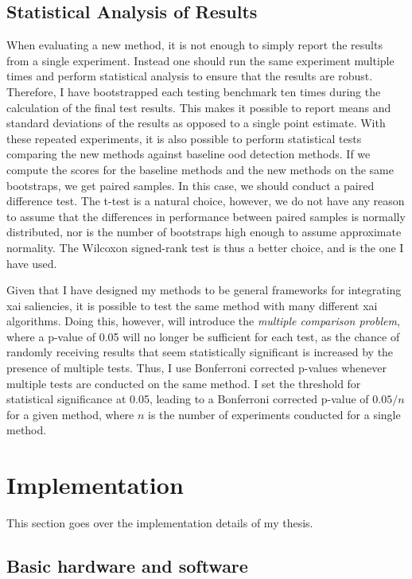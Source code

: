 \documentclass[UKenglish]{uiomasterthesis} %
\theoremstyle{definition}
\begin{document}
\subsection{Statistical Analysis of Results} \label{section:ttest_methodology}

When evaluating a new method, it is not enough to simply report the results from a single experiment. Instead one should run the same experiment multiple times and perform statistical analysis to ensure that the results are robust. Therefore, I have bootstrapped each testing benchmark ten times during the calculation of the final test results. This makes it possible to report means and standard deviations of the results as opposed to a single point estimate. With these repeated experiments, it is also possible to perform statistical tests comparing the new methods against baseline \ac{ood} detection methods. If we compute the scores for the baseline methods and the new methods on the same bootstraps, we get paired samples. In this case, we should conduct a paired difference test. The t-test is a natural choice, however, we do not have any reason to assume that the differences in performance between paired samples is normally distributed, nor is the number of bootstraps high enough to assume approximate normality. The Wilcoxon signed-rank test is thus a better choice, and is the one I have used.

Given that I have designed my methods to be general frameworks for integrating \ac{xai} saliencies, it is possible to test the same method with many different \ac{xai} algorithms. Doing this, however, will introduce the {\it multiple comparison problem}, where a p-value of 0.05 will no longer be sufficient for each test, as the chance of randomly receiving results that seem statistically significant is increased by the presence of multiple tests. Thus, I use Bonferroni corrected p-values whenever multiple tests are conducted on the same method. I set the threshold for statistical significance at 0.05, leading to a Bonferroni corrected p-value of $0.05 / n$ for a given method, where $n$ is the number of experiments conducted for a single method.

\section{Implementation}

This section goes over the implementation details of my thesis.

\subsection{Basic hardware and software}
\end{document}
